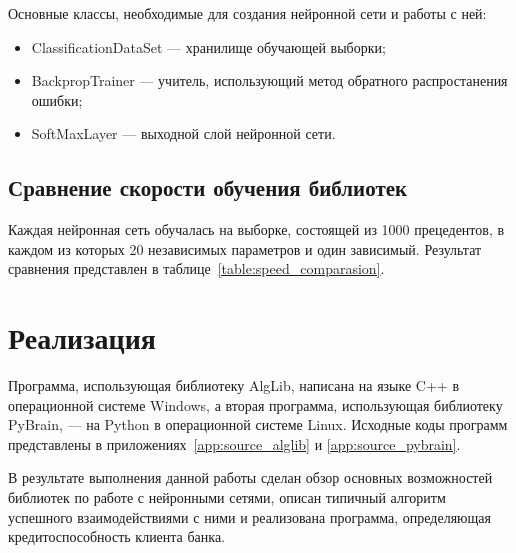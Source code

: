 Основные классы, необходимые для создания нейронной сети и работы с ней:

\begin{itemize}
    \item ClassificationDataSet — хранилище обучающей выборки;
    \item BackpropTrainer — учитель, использующий метод обратного
        распростанения ошибки;
    \item SoftMaxLayer — выходной слой нейронной сети.
\end{itemize}

\subsection{Сравнение скорости обучения библиотек}

Каждая нейронная сеть обучалась на выборке, состоящей из 1000 прецедентов, в
каждом из которых 20 независимых параметров и один зависимый. Результат
сравнения представлен в таблице~\ref{table:speed_comparasion}.


\section{Реализация}

Программа, использующая библиотеку AlgLib, написана на языке C++ в операционной
системе Windows, а вторая программа, использующая библиотеку PyBrain, — на
Python в операционной системе Linux. Исходные коды программ представлены в
приложениях~\ref{app:source_alglib} и \ref{app:source_pybrain}.


В результате выполнения данной работы сделан обзор основных возможностей
библиотек по работе с нейронными сетями, описан типичный алгоритм успешного
взаимодействиями с ними и реализована программа,
определяющая кредитоспособность клиента банка.




\lstset{language=C++, basicstyle=\footnotesize\ttfamily}



\lstset{language=Python}


